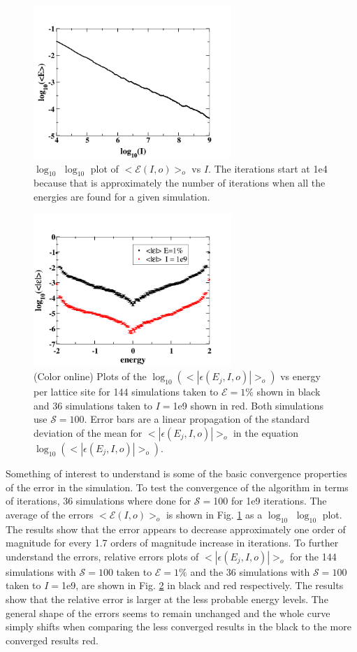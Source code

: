 \documentclass[aps,prl,reprint,superscriptaddress,showkeys]{revtex4-1}
\begin{document}
\begin{figure}
\includegraphics[width=7.5cm]{Fig2.png}
\caption{\label{log_t_err}$\log_{10}$ $\log_{10}$ plot of $<\mathcal{E}(I,o)>_o$ vs $I$.  The iterations start at 1e4 because that is approximately the number of iterations when all the energies are found for a given simulation. }
\end{figure}
\begin{figure}
\includegraphics[width=7.5cm]{Fig3.png}
\caption{\label{rel_errors}(Color online) Plots of the $\log_{10}(<|\epsilon(E_j,I,o)|>_o )$ vs  energy per lattice site for 144 simulations taken to $\mathcal{E}=1\%$ shown in black and  36 simulations taken to $I=$1e9 shown in red. Both simulations use $\mathcal{S}=100$. Error bars are a linear propagation of the standard deviation of the mean for $<|\epsilon(E_j,I,o)|>_o$ in the equation $\log_{10}(<|\epsilon(E_j,I,o)|>_o )$. }
\end{figure}
Something of interest to understand is some of the basic convergence properties of the error in the simulation. To test the convergence of the algorithm in terms of iterations,  36 simulations where done for  $\mathcal{S}=$100 for 1e9 iterations. The average of the errors $<\mathcal{E}(I,o)>_o$ is shown in Fig. \ref{log_t_err}  as a $\log_{10}$ $\log_{10}$  plot. The results show that the error appears to decrease approximately one order of magnitude for every 1.7 orders of magnitude increase in iterations.  To further understand the errors, relative errors plots of $<|\epsilon(E_j,I,o)|>_o$ for the 144 simulations with $\mathcal{S}=100$ taken to $\mathcal{E}=1\%$ and the 36 simulations with $\mathcal{S}=100$ taken to $I=$1e9,  are shown in Fig. \ref{rel_errors} in black and red respectively. The results show that the relative error is larger at the less probable energy levels. The general shape of the errors seems to remain unchanged and the whole curve simply shifts when comparing the less converged results in the black to the more converged results red. 
\end{document}
